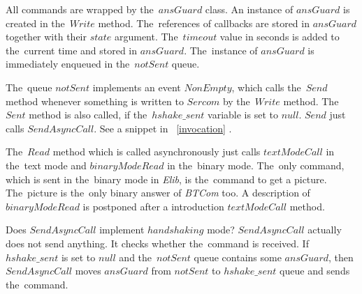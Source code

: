   All commands are wrapped by the~$ansGuard$ class. An instance of $ansGuard$ is created in the~$Write$ method.
  The~references of callbacks are stored in $ansGuard$ together with their $state$ argument.  
  The~$timeout$ value in seconds is added to the~current time and stored in $ansGuard$.
  The~instance of $ansGuard$ is immediately enqueued in the~$notSent$ queue.

  The~queue $notSent$ implements an event $NonEmpty$, which calls the~$Send$ method whenever something is written
  to $Sercom$ by the~$Write$ method. The~$Sent$ method is also called, if the~$hshake\_sent$ variable is set to $null$.
  $Send$ just calls $SendAsyncCall$. See a snippet in ~\ref{invocation} .

  The~$Read$ method which is called asynchronously just calls $textModeCall$
  in the~text mode and $binaryModeRead$ in the~binary mode.
  The~only command, which is sent in the~binary mode in {\it Elib}, is the~command to get a picture.
  The~picture is the~only binary answer of {\it BTCom} too.
  A description of $binaryModeRead$ is postponed after  
  a introduction $textModeCall$ method.

  Does $SendAsyncCall$ implement $handshaking$ mode?
  $SendAsyncCall$ actually does not send anything. It checks whether the~command is received. 
  If $hshake\_sent$ is set to $null$ and the~$notSent$ queue
  contains some $ansGuard$, then $SendAsyncCall$ moves $ansGuard$ from $notSent$ to $hshake\_sent$
  queue and sends the~command. 

